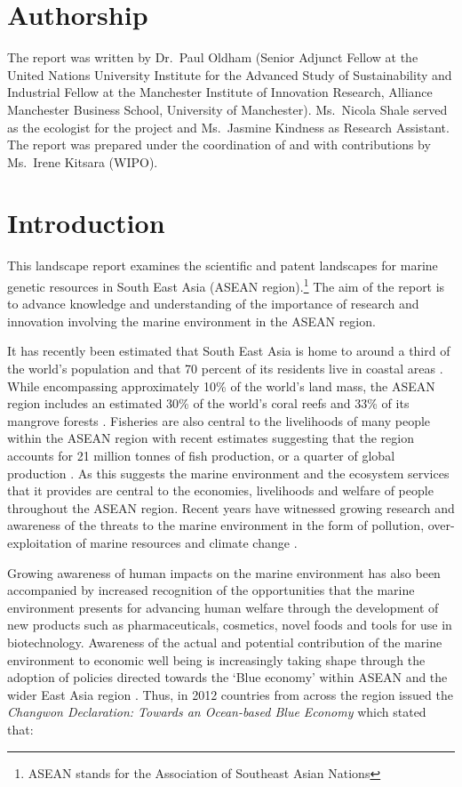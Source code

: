 \documentclass[]{book}
\theoremstyle{definition}
\theoremstyle{definition}
\theoremstyle{definition}
\theoremstyle{remark}
\begin{document}
\hypertarget{authorship}{%
\chapter*{Authorship}\label{authorship}}

The report was written by Dr.~Paul Oldham (Senior Adjunct Fellow at the
United Nations University Institute for the Advanced Study of
Sustainability and Industrial Fellow at the Manchester Institute of
Innovation Research, Alliance Manchester Business School, University of
Manchester). Ms.~Nicola Shale served as the ecologist for the project
and Ms.~Jasmine Kindness as Research Assistant. The report was prepared
under the coordination of and with contributions by Ms.~Irene Kitsara
(WIPO).

\hypertarget{intro}{%
\chapter{Introduction}\label{intro}}

This landscape report examines the scientific and patent landscapes for
marine genetic resources in South East Asia (ASEAN region).\footnote{ASEAN
  stands for the Association of Southeast Asian Nations} The aim of the
report is to advance knowledge and understanding of the importance of
research and innovation involving the marine environment in the ASEAN
region.

It has recently been estimated that South East Asia is home to around a
third of the world's population and that 70 percent of its residents
live in coastal areas \citep[Olewiler in][]{Marine_2016}. While
encompassing approximately 10\% of the world's land mass, the ASEAN
region includes an estimated 30\% of the world's coral reefs and 33\% of
its mangrove forests \citep{Marine_2016}. Fisheries are also central to
the livelihoods of many people within the ASEAN region with recent
estimates suggesting that the region accounts for 21 million tonnes of
fish production, or a quarter of global production \citep[Ferrer
in][]{Marine_2016}. As this suggests the marine environment and the
ecosystem services that it provides are central to the economies,
livelihoods and welfare of people throughout the ASEAN region. Recent
years have witnessed growing research and awareness of the threats to
the marine environment in the form of pollution, over-exploitation of
marine resources and climate change \citep{Marine_2016}.

Growing awareness of human impacts on the marine environment has also
been accompanied by increased recognition of the opportunities that the
marine environment presents for advancing human welfare through the
development of new products such as pharmaceuticals, cosmetics, novel
foods and tools for use in biotechnology. Awareness of the actual and
potential contribution of the marine environment to economic well being
is increasingly taking shape through the adoption of policies directed
towards the `Blue economy' within ASEAN and the wider East Asia region
\citep{Gamage_2016}. Thus, in 2012 countries from across the region
issued the \emph{Changwon Declaration: Towards an Ocean-based Blue
Economy} which stated that:
\end{document}
